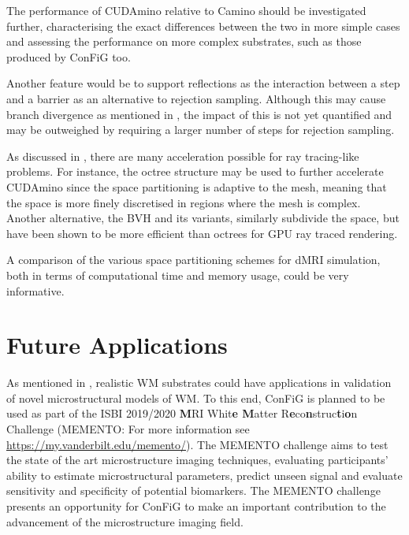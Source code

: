 The performance of CUDAmino relative to Camino should be investigated further, characterising the exact differences between the two in more simple cases and assessing the performance on more complex substrates, such as those produced by ConFiG too. 

Another feature would be to support reflections as the interaction between a step and a barrier as an alternative to rejection sampling.
Although this may cause branch divergence as mentioned in , the impact of this is not yet quantified and may be outweighed by requiring a larger number of steps for rejection sampling.

As discussed in , there are many acceleration possible for ray tracing-like problems.
For instance, the octree structure may be used to further accelerate CUDAmino since the space partitioning is adaptive to the mesh, meaning that the space is more finely discretised in regions where the mesh is complex.
Another alternative, the \acl{BVH} and its variants, similarly subdivide the space, but have been shown to be more efficient than octrees for GPU ray traced rendering\cite{Chajdas2014}.

A comparison of the various space partitioning schemes for \ac{dMRI} simulation, both in terms of computational time and memory usage, could be very informative. 


\section{Future Applications}
\label{sec:future_applications}

As mentioned in , realistic \ac{WM} substrates could have applications in validation of novel microstructural models of \ac{WM}.
To this end, \ac{ConFiG} is planned to be used as part of the ISBI 2019/2020 \textbf{M}RI Whit\textbf{e M}atter R\textbf{e}co\textbf{n}struc\textbf{t}i\textbf{o}n Challenge (MEMENTO: For more information see \url{https://my.vanderbilt.edu/memento/}).
The MEMENTO challenge aims to test the state of the art microstructure imaging techniques, evaluating participants' ability to estimate microstructural parameters, predict unseen signal and evaluate sensitivity and specificity of potential biomarkers.
The MEMENTO challenge presents an opportunity for ConFiG to make an important contribution to the advancement of the microstructure imaging field. 

